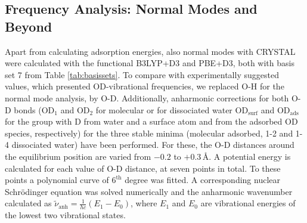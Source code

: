\documentclass[11pt,DIV=13,BCOR=5mm,a4paper,headinclude]{scrbook}
\newcommand\todo[1]{\textcolor{red}{TODO: \textit{{#1}}}}
\begin{document}
\subsection{Frequency Analysis: Normal Modes and Beyond}\label{sec:AO_freq0001}
Apart from calculating adsorption energies, also normal modes with CRYSTAL were calculated with the functional B3LYP+D3 and PBE+D3, both with basis set 7 from Table \ref{tab:basissets}.
To compare with experimentally suggested values\cite{Wirth2014}, which presented OD-vibrational frequencies, we replaced O-H for the normal mode analysis, by O-D.
Additionally, anharmonic corrections for both O-D bonds (OD$_{\textrm{1}}$ and OD$_{\textrm{2}}$ for molecular or for dissociated water OD$_{\textrm{surf}}$ and OD$_{\textrm{ads}}$ for the group with D from water and a surface atom and from the adsorbed OD species, respectively) for the three stable minima (molecular adsorbed, 1-2 and 1-4 dissociated water) have been performed.
For these, the O-D distances around the equilibrium position are varied from $-0.2$ to $+0.3\,$\AA{}.
A potential energy is calculated for each value of O-D distance, at seven points in total.
To these points a polynomial curve of $6^\textrm{th}$ degree was fitted.
A corresponding nuclear Schrödinger equation was solved numerically and the anharmonic wavenumber calculated as $\tilde{\nu}_\textrm{anh}=\frac{1}{hc}(E_1-E_0)$, where $E_1$ and $E_0$ are vibrational energies of the lowest two vibrational states.
\end{document}
